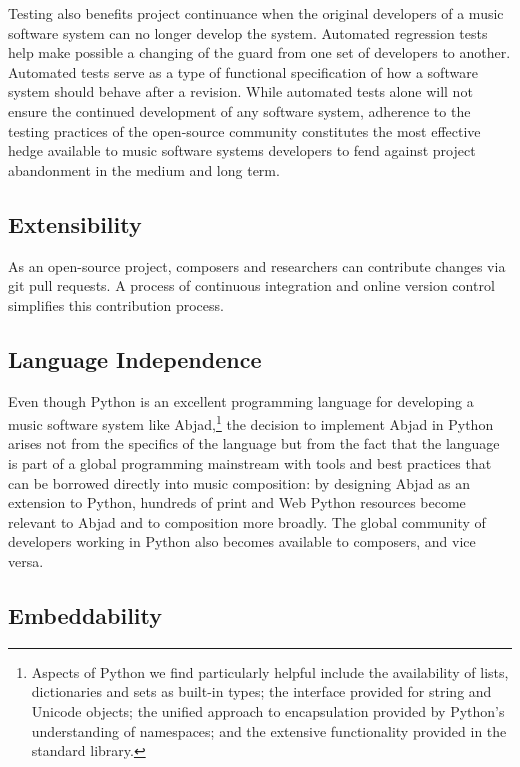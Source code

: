 \documentclass{article}
\begin{document}
Testing also benefits project continuance when the original developers of a
music software system can no longer develop the system. Automated regression
tests help make possible a changing of the guard from one set of developers to
another. Automated tests serve as a type of functional specification of how a
software system should behave after a revision. While
automated tests alone will not ensure the continued development of any software
system, adherence to the testing practices of the open-source community
constitutes the most effective hedge available to music software systems
developers to fend against project abandonment in the medium and long term.

\subsection{Extensibility}

As an open-source project, composers and researchers can contribute changes via
git pull requests. A process of continuous integration and online version
control simplifies this contribution process.

\subsection{Language Independence}

Even though Python is an excellent programming language for developing a music
software system like Abjad,\footnote{Aspects of Python we find particularly
helpful include the availability of lists, dictionaries and sets as built-in
types; the interface provided for string and Unicode objects; the unified
approach to encapsulation provided by Python's understanding of namespaces; and
the extensive functionality provided in the standard library.} the decision to
implement Abjad in Python arises not from the specifics of the language but
from the fact that the language is part of a global programming mainstream with
tools and best practices that can be borrowed directly into music composition:
by designing Abjad as an extension to Python, hundreds of print and Web Python
resources become relevant to Abjad and to composition more broadly. The global
community of developers working in Python also becomes available to composers,
and vice versa.

\subsection{Embeddability}
\end{document}
